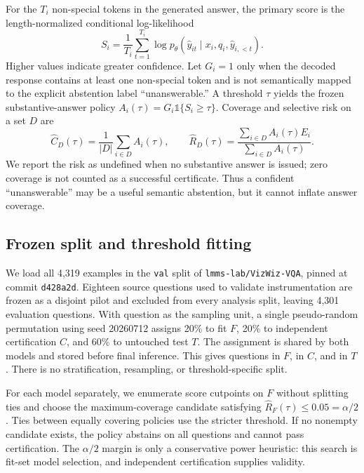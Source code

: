 \documentclass[11pt]{article}
\newcommand{\FitRiskHeuristic}{0.05}
\newcommand{\FitFraction}{20\%}
\newcommand{\CertFraction}{20\%}
\newcommand{\TestFraction}{60\%}
\newcommand{\SplitSeed}{20260712}
\newcommand{\FitN}{}
\newcommand{\CertN}{}
\newcommand{\TestN}{}
\begin{document}
For the $T_i$ non-special tokens in the generated answer, the primary score is
the length-normalized conditional log-likelihood
\begin{equation}
  S_i = \frac{1}{T_i}\sum_{t=1}^{T_i}
  \log p_\theta(\hat y_{it}\mid x_i,q_i,\hat y_{i,<t}).
  \label{eq:score}
\end{equation}
Higher values indicate greater confidence.  Let $G_i=1$ only when the decoded
response contains at least one non-special token and is not semantically mapped to
the explicit abstention label ``unanswerable.''  A threshold $\tau$ yields the frozen
substantive-answer policy
$A_i(\tau)=G_i\mathbb{1}\{S_i\geq\tau\}$.  Coverage and selective risk
on a set $D$ are
\begin{equation}
 \widehat C_D(\tau)=\frac{1}{|D|}\sum_{i\in D}A_i(\tau),\qquad
 \widehat R_D(\tau)=
 \frac{\sum_{i\in D}A_i(\tau)E_i}{\sum_{i\in D}A_i(\tau)}.
 \label{eq:riskcoverage}
\end{equation}
We report the risk as undefined when no substantive answer is issued; zero coverage
is not counted as a successful certificate.  Thus a confident ``unanswerable'' may
be a useful semantic abstention, but it cannot inflate answer coverage.

\subsection{Frozen split and threshold fitting}

We load all 4,319 examples in the \texttt{val} split of
\texttt{lmms-lab/VizWiz-VQA}, pinned at commit \texttt{d428a2d}.  Eighteen source
questions used to validate instrumentation are frozen as a disjoint pilot and
excluded from every analysis split, leaving 4,301 evaluation questions.  With
question as the sampling unit, a single pseudo-random permutation
using seed \SplitSeed{} assigns \FitFraction{} to fit $F$, \CertFraction{} to
independent certification $C$, and \TestFraction{} to untouched test $T$.  The
assignment is shared by both models and stored before final inference.  This gives
\FitN{} questions in $F$, \CertN{} in $C$, and \TestN{} in $T$.  There is no stratification,
resampling, or threshold-specific split.

For each model separately, we enumerate score cutpoints on $F$ without splitting
ties and choose the maximum-coverage candidate satisfying
$\widehat R_F(\tau)\leq\FitRiskHeuristic=\alpha/2$.  Ties between equally covering
policies use the stricter threshold.  If no nonempty candidate exists, the policy
abstains on all questions and cannot pass certification.  The $\alpha/2$ margin is
only a conservative power heuristic: this search is fit-set model selection, and
independent certification supplies validity.
\end{document}
